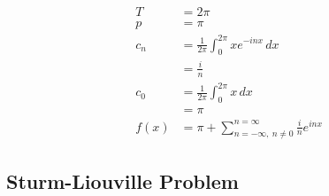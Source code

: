 \documentclass{article}
\begin{document}
\setcounter{subsubsection}{4}
\subsubsection{}

\begin{align*}
  T    & = 2 \pi                                                                 \\
  p    & = \pi                                                                   \\
  c_n  & = \frac{1}{2 \pi} \int_0^{2 \pi} x e^{-i n x} \,d x                     \\
       & = \frac{i}{n}                                                           \\
  c_0  & = \frac{1}{2 \pi} \int_0^{2 \pi} x \,d x                                \\
       & = \pi                                                                   \\
  f(x) & = \pi + \sum_{n = -\infty,\ n \ne 0}^{n = \infty} \frac{i}{n} e^{i n x}
\end{align*}

\subsection{Sturm-Liouville Problem}

\subsubsection{}
\end{document}
